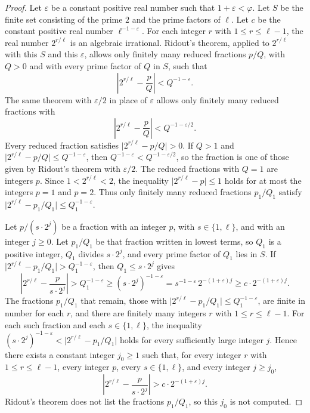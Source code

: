 \documentclass[11pt]{article}
\begin{document}
\begin{proof}
Let $\varepsilon$ be a constant positive real number such that $1 + \varepsilon < \varphi$.
Let $S$ be the finite set consisting of the prime $2$ and the prime factors of $\ell$.
Let $c$ be the constant positive real number $\ell^{-1-\varepsilon}$.
For each integer $r$ with $1 \le r \le \ell - 1$, the real number $2^{r/\ell}$ is an algebraic irrational.
Ridout's theorem, applied to $2^{r/\ell}$ with this $S$ and this $\varepsilon$, allows only finitely many reduced fractions $p/Q$, with $Q > 0$ and with every prime factor of $Q$ in $S$, such that
\[
\left| 2^{r/\ell} - \frac{p}{Q} \right| < Q^{-1-\varepsilon}.
\]
The same theorem with $\varepsilon/2$ in place of $\varepsilon$ allows only finitely many reduced fractions with
\[
\left| 2^{r/\ell} - \frac{p}{Q} \right| < Q^{-1-\varepsilon/2}.
\]
Every reduced fraction satisfies $\bigl|2^{r/\ell} - p/Q\bigr| > 0$.
If $Q > 1$ and $\bigl|2^{r/\ell} - p/Q\bigr| \le Q^{-1-\varepsilon}$, then $Q^{-1-\varepsilon} < Q^{-1-\varepsilon/2}$, so the fraction is one of those given by Ridout's theorem with $\varepsilon/2$.
The reduced fractions with $Q = 1$ are integers $p$.
Since $1 < 2^{r/\ell} < 2$, the inequality $\bigl|2^{r/\ell} - p\bigr| \le 1$ holds for at most the integers $p = 1$ and $p = 2$.
Thus only finitely many reduced fractions $p_1/Q_1$ satisfy $\bigl|2^{r/\ell} - p_1/Q_1\bigr| \le Q_1^{-1-\varepsilon}$.

Let $p/(s \cdot 2^j)$ be a fraction with an integer $p$, with $s \in \{1, \ell\}$, and with an integer $j \ge 0$.
Let $p_1/Q_1$ be that fraction written in lowest terms, so $Q_1$ is a positive integer, $Q_1$ divides $s \cdot 2^j$, and every prime factor of $Q_1$ lies in $S$.
If $\bigl|2^{r/\ell} - p_1/Q_1\bigr| > Q_1^{-1-\varepsilon}$, then $Q_1 \le s \cdot 2^j$ gives
\[
\left| 2^{r/\ell} - \frac{p}{s \cdot 2^j} \right|
> Q_1^{-1-\varepsilon}
\ge (s \cdot 2^j)^{-1-\varepsilon}
= s^{-1-\varepsilon}\, 2^{-(1+\varepsilon)j}
\ge c \cdot 2^{-(1+\varepsilon)j}.
\]
The fractions $p_1/Q_1$ that remain, those with $\bigl|2^{r/\ell} - p_1/Q_1\bigr| \le Q_1^{-1-\varepsilon}$, are finite in number for each $r$, and there are finitely many integers $r$ with $1 \le r \le \ell - 1$.
For each such fraction and each $s \in \{1, \ell\}$, the inequality $(s \cdot 2^j)^{-1-\varepsilon} < \bigl|2^{r/\ell} - p_1/Q_1\bigr|$ holds for every sufficiently large integer $j$.
Hence there exists a constant integer $j_0 \ge 1$ such that, for every integer $r$ with $1 \le r \le \ell - 1$, every integer $p$, every $s \in \{1, \ell\}$, and every integer $j \ge j_0$,
\[
\left| 2^{r/\ell} - \frac{p}{s \cdot 2^j} \right| > c \cdot 2^{-(1+\varepsilon)j}.
\]
Ridout's theorem does not list the fractions $p_1/Q_1$, so this $j_0$ is not computed.


\end{proof}
\end{document}
